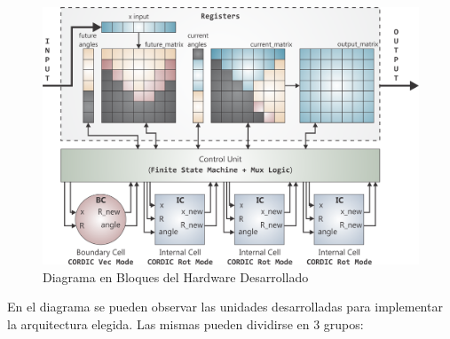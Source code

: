 \begin{figure}[!h]
 	\begin{center}
 		\includegraphics[width=\textwidth]{./figures/C04-block_diagram}
 		\caption{Diagrama en Bloques del Hardware Desarrollado}
		\label{block_diagram}
 	\end{center}
\end{figure}

En el diagrama se pueden observar las unidades desarrolladas para implementar la arquitectura elegida. Las mismas pueden dividirse en 3 grupos:

